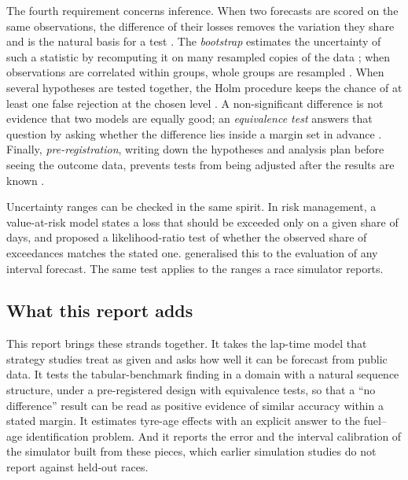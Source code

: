 \documentclass[12pt]{article}
\begin{document}
The fourth requirement concerns inference. When two forecasts are scored on the same observations, the difference of
their losses removes the variation they share and is the natural basis for a test \parencite{diebold1995}. The
\emph{bootstrap} estimates the uncertainty of such a statistic by recomputing it on many resampled copies of the data
\parencite{efron1979}; when observations are correlated within groups, whole groups are resampled
\parencite{cameron2008}. When several hypotheses are tested together, the Holm procedure keeps the chance of at least one
false rejection at the chosen level \parencite{holm1979}. A non-significant difference is not evidence that two models
are equally good; an \emph{equivalence test} answers that question by asking whether the difference lies inside a
margin set in advance \parencite{schuirmann1987,lakens2017}. Finally, \emph{pre-registration}, writing down the
hypotheses and analysis plan before seeing the outcome data, prevents tests from being adjusted after the results are
known \parencite{nosek2018}.

Uncertainty ranges can be checked in the same spirit. In risk management, a value-at-risk model states a loss that
should be exceeded only on a given share of days, and \textcite{kupiec1995} proposed a likelihood-ratio test of whether
the observed share of exceedances matches the stated one. \textcite{christoffersen1998} generalised this to the
evaluation of any interval forecast. The same test applies to the ranges a race simulator reports.

\subsection{What this report adds}\label{sec:lit-gap}

This report brings these strands together. It takes the lap-time model that strategy studies treat as given and asks how
well it can be forecast from public data. It tests the tabular-benchmark finding in a domain with a natural sequence
structure, under a pre-registered design with equivalence tests, so that a ``no difference'' result can be read as
positive evidence of similar accuracy within a stated margin. It estimates tyre-age effects with an explicit answer to
the fuel--age identification problem. And it reports the error and the interval calibration of the simulator built from
these pieces, which earlier simulation studies do not report against held-out races.

\end{document}
